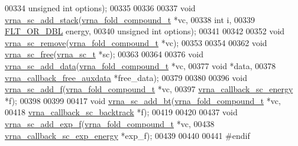 \begin{DoxyCode}
00334                        \textcolor{keywordtype}{unsigned} \textcolor{keywordtype}{int}         options);
00335 
00336 
00337 \textcolor{keywordtype}{void} \mbox{\hyperlink{constraints__soft_8h_a436f796fab3878eef5661608e2e47057}{vrna\_sc\_add\_stack}}(\mbox{\hyperlink{group__fold__compound_structvrna__fc__s}{vrna\_fold\_compound\_t}} *vc,
00338                        \textcolor{keywordtype}{int}                  i,
00339                        \mbox{\hyperlink{group__data__structures_ga31125aeace516926bf7f251f759b6126}{FLT\_OR\_DBL}}           energy,
00340                        \textcolor{keywordtype}{unsigned} \textcolor{keywordtype}{int}         options);
00341 
00342 
00352 \textcolor{keywordtype}{void} \mbox{\hyperlink{group__soft__constraints_ga73cdc07b9a199c614367bebef0f2c41a}{vrna\_sc\_remove}}(\mbox{\hyperlink{group__fold__compound_structvrna__fc__s}{vrna\_fold\_compound\_t}} *vc);
00353 
00354 
00362 \textcolor{keywordtype}{void} \mbox{\hyperlink{group__soft__constraints_ga6d55446448d69346fc313b993c4fb3e8}{vrna\_sc\_free}}(\mbox{\hyperlink{group__soft__constraints_structvrna__sc__s}{vrna\_sc\_t}} *sc);
00363 
00364 
00376 \textcolor{keywordtype}{void} \mbox{\hyperlink{group__soft__constraints_ga15c6d52471ec97897e2bb7f964f5deb6}{vrna\_sc\_add\_data}}(\mbox{\hyperlink{group__fold__compound_structvrna__fc__s}{vrna\_fold\_compound\_t}}        *vc,
00377                       \textcolor{keywordtype}{void}                        *data,
00378                       \mbox{\hyperlink{group__fold__compound_ga7806651f51b195013839a218b3bbd5a3}{vrna\_callback\_free\_auxdata}}  *free\_data);
00379 
00380 
00396 \textcolor{keywordtype}{void} \mbox{\hyperlink{group__soft__constraints_ga8c7d907ec0125cd61c04e0908010a4e9}{vrna\_sc\_add\_f}}(\mbox{\hyperlink{group__fold__compound_structvrna__fc__s}{vrna\_fold\_compound\_t}}     *vc,
00397                    \mbox{\hyperlink{group__soft__constraints_ga88a266695d9e25cc12114dceb7b4565e}{vrna\_callback\_sc\_energy}}  *f);
00398 
00399 
00417 \textcolor{keywordtype}{void} \mbox{\hyperlink{group__soft__constraints_gabde7d07a79bb9a8f4721aee247b674ea}{vrna\_sc\_add\_bt}}(\mbox{\hyperlink{group__fold__compound_structvrna__fc__s}{vrna\_fold\_compound\_t}}        *vc,
00418                     \mbox{\hyperlink{group__soft__constraints_gaeb6448da6c593d4c489c7fbadcb99499}{vrna\_callback\_sc\_backtrack}}  *f);
00419 
00420 
00437 \textcolor{keywordtype}{void} \mbox{\hyperlink{group__soft__constraints_ga87e382b5d0c9b7d9ce1b79c0473ff700}{vrna\_sc\_add\_exp\_f}}(\mbox{\hyperlink{group__fold__compound_structvrna__fc__s}{vrna\_fold\_compound\_t}}         *vc,
00438                        \mbox{\hyperlink{group__soft__constraints_ga4099978d410513edeeff8f3db13144c5}{vrna\_callback\_sc\_exp\_energy}}  *exp\_f);
00439 
00440 
00441 \textcolor{preprocessor}{#endif}
\end{DoxyCode}
